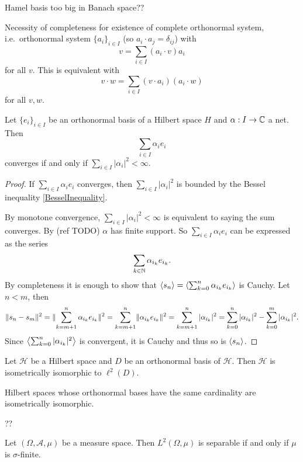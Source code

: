 Hamel basis too big in Banach space??

Necessity of completeness for existence of complete orthonormal system, i.e.\ orthonormal system $\{a_i\}_{i\in I}$ (so $a_i \cdot a_j = \delta_{ij}$) with
\[ v = \sum_{i\in I}(a_i \cdot v)a_i \]
for all $v$. This is equivalent with
\[ v \cdot w = \sum_{i\in I}(v\cdot a_i)(a_i \cdot w) \]
for all $v,w$.


\begin{theorem}
Let $\{e_i\}_{i\in I}$ be an orthonormal basis of a Hilbert space $H$ and $\alpha: I\to \mathbb{C}$ a net. Then
\[ \sum_{i\in I}\alpha_i e_i \]
converges \textup{if and only if} $\sum_{i\in I}|\alpha_i|^2 < \infty$. 
\end{theorem}
\begin{proof}
If $\sum_{i\in I}\alpha_i e_i$ converges, then $\sum_{i\in I}|\alpha_i|^2$ is bounded by the Bessel inequality \ref{BesselInequality}.

By monotone convergence, $\sum_{i\in I}|\alpha_i|^2 < \infty$ is equivalent to saying the sum converges. By (ref TODO) $\alpha$ has finite support. So $\sum_{i\in I}\alpha_i e_i$ can be expressed as the series
\[ \sum_{k\in \mathbb{N}}\alpha_{i_k} e_{i_k}. \]
By completeness it is enough to show that $\left\langle s_n \right\rangle = \left\langle \sum_{k=0}^n\alpha_{i_k} e_{i_k} \right\rangle$ is Cauchy. Let $n < m$, then
\[ \lVert s_n - s_m\rVert^2 = \lVert\sum_{k=m+1}^n\alpha_{i_k} e_{i_k}\rVert^2 = \sum_{k=m+1}^n\lVert\alpha_{i_k} e_{i_k}\rVert^2 = \sum_{k=m+1}^n |\alpha_{i_k}|^2 = \sum_{k=0}^n|\alpha_{i_k}|^2 -\sum_{k=0}^m|\alpha_{i_k}|^2.  \]
Since $\left\langle \sum_{k=0}^n |\alpha_{i_k}|^2 \right\rangle$ is convergent, it is Cauchy and thus so is $\left\langle s_n \right\rangle$.
\end{proof}
\begin{corollary}
Let $\mathcal{H}$ be a Hilbert space and $D$ be an orthonormal basis of $\mathcal{H}$. Then $\mathcal{H}$ is isometrically isomorphic to $\ell^2(D)$.
\end{corollary}
\begin{corollary}
Hilbert spaces whose orthonormal bases have the same cardinality are isometrically isomorphic.
\end{corollary}

??
\begin{lemma}
Let $(\Omega,\mathcal{A}, \mu)$ be a measure space. Then $L^2(\Omega, \mu)$ is separable \textup{if and only if} $\mu$ is $\sigma$-finite.
\end{lemma}

